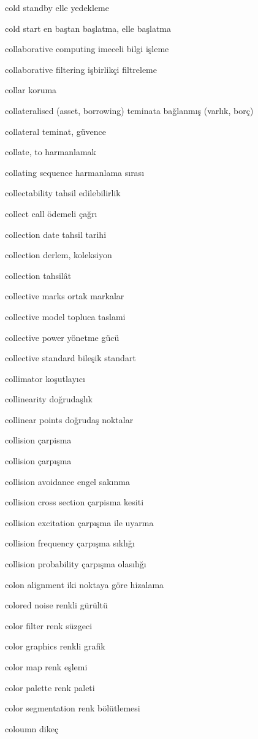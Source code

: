\documentclass[12pt,fleqn]{article}\usepackage{../../common}
\begin{document}
cold standby elle yedekleme

cold start en baştan başlatma, elle başlatma

collaborative computing imeceli bilgi işleme

collaborative filtering işbirlikçi filtreleme

collar koruma

collateralised (asset, borrowing) teminata bağlanmış (varlık, borç)

collateral teminat, güvence

collate, to harmanlamak

collating sequence harmanlama sırası

collectability tahsil edilebilirlik

collect call ödemeli çağrı

collection date tahsil tarihi

collection derlem, koleksiyon

collection tahsilât

collective marks ortak markalar

collective model topluca taslami

collective power yönetme gücü

collective standard bileşik standart

collimator koşutlayıcı

collinearity doğrudaşlık

collinear points doğrudaş noktalar

collision çarpisma

collision çarpışma

collision avoidance engel sakınma

collision cross section çarpisma kesiti

collision excitation çarpışma ile uyarma

collision frequency çarpışma sıklığı

collision probability çarpışma olasılığı

colon alignment iki noktaya göre hizalama

colored noise renkli gürültü

color filter renk süzgeci

color graphics renkli grafik

color map renk eşlemi

color palette renk paleti

color segmentation renk bölütlemesi

coloumn dikeç
\end{document}
